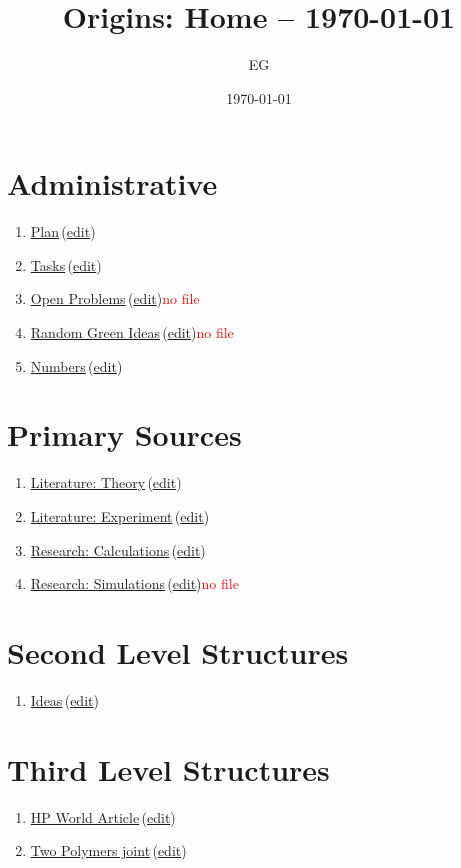 \documentclass[12pt]{paper}
\title{Origins: Home -- \today}
\author{EG}
\date{\today}
\newcommand{\red}[1]{\textcolor{red}{#1}}
\newcommand{\wikilink}[2] { \href{#1.pdf}{#2}\,(\href{#1.tex}{edit})}
\begin{document}
 \maketitle
 \tableofcontents
 
\section{Administrative}


\begin{enumerate}
 \item \wikilink{plan}{Plan}
 \item \wikilink{tasks}{Tasks}
 \item \wikilink{open\_problems}{Open Problems}\red{no file}
 \item \wikilink{green\_ideas}{Random Green Ideas}\red{no file}
 \item \wikilink{numbers}{Numbers}
 
\end{enumerate}

\section{Primary Sources}
\begin{enumerate}
 \item \wikilink{literature\_theory}{Literature: Theory}
 \item \wikilink{literature\_experiment}{Literature: Experiment}
 \item \wikilink{research\_calculations}{Research: Calculations}
 \item \wikilink{research\_simulations}{Research: Simulations}\red{no file}
\end{enumerate}

\section{Second Level Structures}
\begin{enumerate}
 \item \wikilink{ideas}{Ideas}
\end{enumerate}

\section{Third Level Structures}


\begin{enumerate}
 \item \wikilink{hp\_world}{HP World Article}
 \item \wikilink{twoPolymers}{Two Polymers joint}
\end{enumerate}




% 
% 

 
\end{document}

